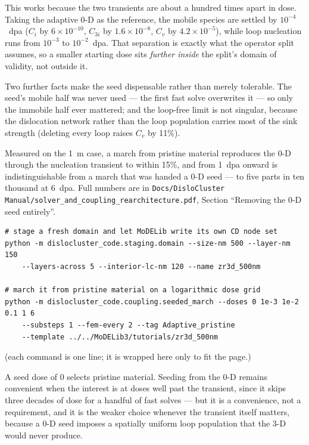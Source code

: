 \documentclass[11pt]{article}
\newcommand{\file}[1]{\texttt{\footnotesize #1}}
\begin{document}
This works because the two transients are about a hundred times apart in dose.
Taking the adaptive 0-D as the reference, the mobile species are settled by
$10^{-4}$~\textrm{dpa} ($C_i$ by $6\times10^{-10}$, $C_{3i}$ by
$1.6\times10^{-8}$, $C_v$ by $4.2\times10^{-5}$), while loop nucleation runs
from $10^{-3}$ to $10^{-2}$~\textrm{dpa}. That separation is exactly what the
operator split assumes, so a smaller starting dose sits \emph{further inside}
the split's domain of validity, not outside it.

Two further facts make the seed dispensable rather than merely tolerable.
The seed's mobile half was never used --- the first fast solve overwrites it ---
so only the immobile half ever mattered; and the loop-free limit is not
singular, because the dislocation network rather than the loop population
carries most of the sink strength (deleting every loop raises $C_v$ by 11\%).

Measured on the 1~\textmu m case, a march from pristine material reproduces the
0-D through the nucleation transient to within 15\%, and from 1~\textrm{dpa}
onward is indistinguishable from a march that was handed a 0-D seed --- to five
parts in ten thousand at 6~\textrm{dpa}. Full numbers are in
\file{Docs/DisloCluster Manual/solver\_and\_coupling\_rearchitecture.pdf},
Section ``Removing the 0-D seed entirely''.

\begin{lstlisting}
# stage a fresh domain and let MoDELib write its own CD node set
python -m dislocluster_code.staging.domain --size-nm 500 --layer-nm 150
    --layers-across 5 --interior-lc-nm 120 --name zr3d_500nm

# march it from pristine material on a logarithmic dose grid
python -m dislocluster_code.coupling.seeded_march --doses 0 1e-3 1e-2 0.1 1 6
    --substeps 1 --fem-every 2 --tag Adaptive_pristine
    --template ../../MoDELib3/tutorials/zr3d_500nm
\end{lstlisting}

\noindent
(each command is one line; it is wrapped here only to fit the page.)

\noindent
A seed dose of $0$ selects pristine material. Seeding from the 0-D remains
convenient when the interest is at doses well past the transient, since it skips
three decades of dose for a handful of fast solves --- but it is a convenience,
not a requirement, and it is the weaker choice whenever the transient itself
matters, because a 0-D seed imposes a spatially uniform loop population that the
3-D would never produce.
\end{document}
